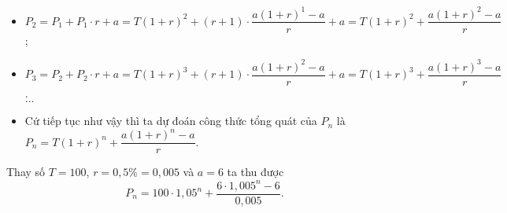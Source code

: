 \begin{ex}
{\begin{itemchoice}
\begin{itemize}
\item $P_2=P_1+P_1\cdot r+a=T{(1+r)^2}+(r+1)\cdot\dfrac{a{(1+r)^1}-a}{r}+a=T{(1+r)^2}+\dfrac{a{(1+r)^2}-a}{r}$;
\item $P_3=P_2+P_2\cdot r+a=T{(1+r)^3}+(r+1)\cdot\dfrac{a{(1+r)^2}-a}{r}+a=T{(1+r)^3}+\dfrac{a{(1+r)^3}-a}{r}$. \\
$\ldots$
\item Cứ tiếp tục như vậy thì ta dự đoán công thức tổng quát của $P_n$ là\\
			$P_n=T{(1+r)^n}+\dfrac{a{(1+r)^n}-a}{r}.$		
\end{itemize}
Thay số $T=100$, $r=0{,}5\%=0{,}005$ và $a=6$ ta thu được\\
$$P_n=100\cdot{1{,}05^n}+\dfrac{6\cdot{1{,}005^n}-6}{0{,}005}.$$
	\end{itemchoice}	
	}
	\end{ex}
	
